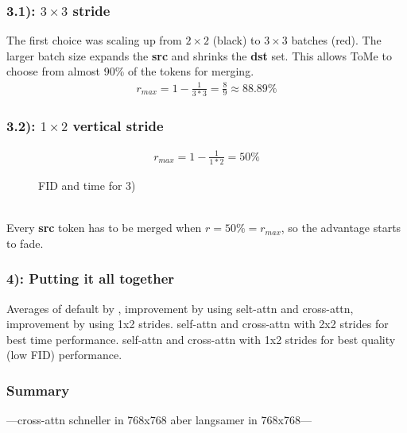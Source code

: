 \subsubsection*{3.1): $3 \times 3$ stride}
The first choice was scaling up from $2 \times 2$ (black) to $3 \times 3$ batches (red). The larger batch size expands the \textbf{src} and shrinks the \textbf{dst} set. This allows ToMe to choose from almost 90\% of the tokens for merging.
\begin{align*}
    r_{max} = 1-\frac{1}{3*3} = \frac{8}{9} \approx 88.89\%
\end{align*}
\subsubsection*{3.2): $1 \times 2$ vertical stride}

\begin{align*}
    r_{max} = 1-\frac{1}{1*2} = 50\%
\end{align*}
\begin{figure}[!htb]
    
    
\caption{FID and time for 3)}
\label{fig:exp_3}
\end{figure}\\
Every  \textbf{src} token has to be merged when \(r=50\%=r_{max}\), so the advantage starts to fade.



\newpage
\subsubsection*{4): Putting it all together}
Averages of default by \cite{bolya2023tomesd}, improvement by using selt-attn and cross-attn, improvement by using 1x2 strides. 
self-attn and cross-attn with 2x2 strides for best time performance. self-attn and cross-attn with 1x2 strides for best quality (low FID) performance.
\begin{figure}[!htb]
    
    
\end{figure}



\subsubsection*{Summary}
---cross-attn schneller in 768x768 aber langsamer in 768x768---
